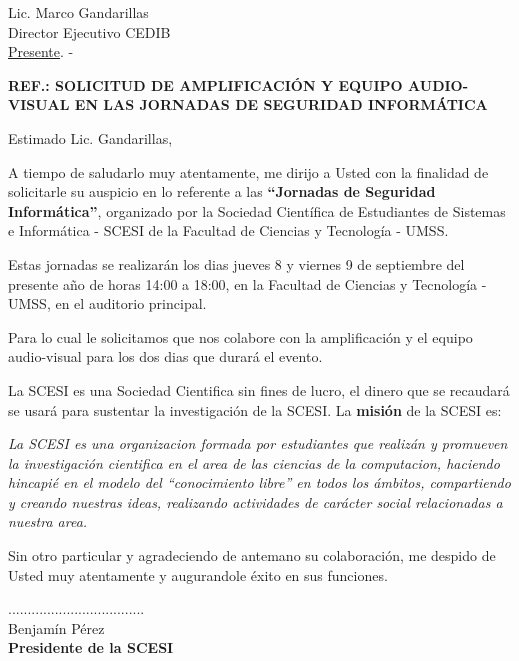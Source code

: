 \documentclass[letterpaper,12pt]{letter}
\begin{document}
\date {18 de agosto de 2011}
\begin{letter}{Lic. Marco Gandarillas \\ Director Ejecutivo CEDIB \\ \underline {Presente}. -}

\begin{center}
	\opening{\textbf{REF.: SOLICITUD DE AMPLIFICACI\'ON Y EQUIPO AUDIO-VISUAL EN LAS JORNADAS DE SEGURIDAD INFORM\'ATICA}}
\end{center}

Estimado Lic. Gandarillas,

A tiempo de saludarlo muy atentamente, me dirijo a Usted con la finalidad de solicitarle su auspicio en lo referente 
a las {\bfseries ``Jornadas de Seguridad Inform\'atica''}, organizado por la Sociedad Cient\'ifica de Estudiantes de 
Sistemas e Inform\'atica - SCESI de la Facultad de Ciencias y Tecnolog\'ia - UMSS.

Estas jornadas se realizar\'an los dias jueves 8 y viernes 9 de septiembre del presente a\~no de horas 14:00 a 
18:00, en la Facultad de Ciencias y Tecnolog\'ia - UMSS, en el auditorio principal.

Para lo cual le solicitamos que nos colabore con la amplificaci\'on y el equipo audio-visual para los dos dias que 
durar\'a el evento.

La SCESI es una Sociedad Cientifica sin fines de lucro, el dinero que se recaudar\'a se usar\'a para sustentar la 
investigaci\'on de la SCESI. La {\bfseries misi\'on} de la SCESI es:

{\it La SCESI es una organizacion formada por estudiantes que realiz\'an y
    promueven la investigación cientifica en el area de las ciencias de la
        computacion, haciendo hincapié en el modelo del ``conocimiento libre'' en
        todos los ámbitos, compartiendo y creando nuestras ideas, realizando
        actividades de carácter social relacionadas a nuestra area. }

Sin otro particular y agradeciendo de antemano su colaboraci\'on, me despido de Usted muy atentamente y augurandole \'exito en sus funciones.\\

\vspace{2cm}

\begin{center}
...................................\\
Benjam\'in P\'erez\\
{\bfseries Presidente de la  SCESI}
\end{center}

\end{letter}
\end{document}
